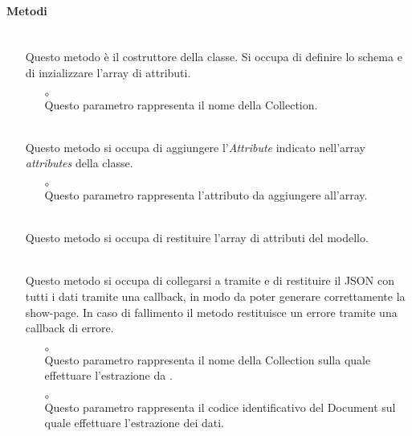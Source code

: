 \paragraph*{Metodi}
\begin{itemize}
\item[]  \\ Questo metodo è il costruttore della classe. Si occupa di definire lo schema e di inzializzare l'array di attributi.
\begin{itemize}\addtolength{\itemsep}{-0.5\baselineskip}
\item[$\circ$]  \\ Questo parametro rappresenta il nome della Collection.
\end{itemize}
\item[]  \\ Questo metodo si occupa di aggiungere l'\textit{Attribute} indicato nell'array \textit{attributes} della classe.
\begin{itemize}\addtolength{\itemsep}{-0.5\baselineskip}
\item[$\circ$]  \\ Questo parametro rappresenta l'attributo da aggiungere all'array.
\end{itemize}
\item[]  \\ Questo metodo si occupa di restituire l'array di attributi del modello.
\item[]  \\ Questo metodo si occupa di collegarsi a  tramite  e di restituire il JSON con tutti i dati tramite una callback, in modo da poter generare correttamente la show-page. In caso di fallimento il metodo restituisce un errore tramite una callback di errore.
\begin{itemize}\addtolength{\itemsep}{-0.5\baselineskip}
\item[$\circ$]  \\ Questo parametro rappresenta il nome della Collection sulla quale effettuare l'estrazione da .
\item[$\circ$]  \\ Questo parametro rappresenta il codice identificativo del Document sul quale effettuare l'estrazione dei dati.

\end{itemize}
\end{itemize}
